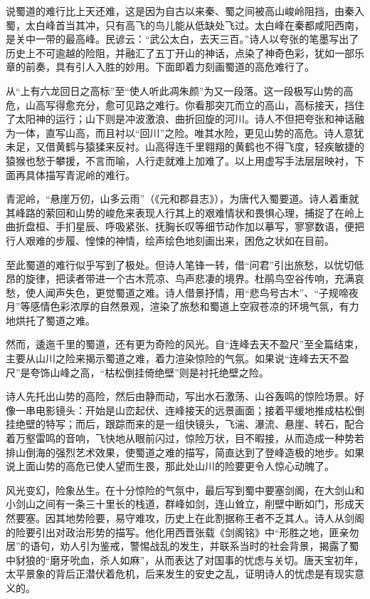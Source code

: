 \documentclass[letterpaper,12pt,english]{sphinxmanual}
\begin{document}
说蜀道的难行比上天还难，这是因为自古以来秦、蜀之间被高山峻岭阻挡，由秦入蜀，太白峰首当其冲，只有高飞的鸟儿能从低缺处飞过。太白峰在秦都咸阳西南，是关中一带的最高峰。民谚云：“武公太白，去天三百。”诗人以夸张的笔墨写出了历史上不可逾越的险阻，并融汇了五丁开山的神话，点染了神奇色彩，犹如一部乐章的前奏，具有引人入胜的妙用。下面即着力刻画蜀道的高危难行了。

从“上有六龙回日之高标”至“使人听此凋朱颜”为又一段落。这一段极写山势的高危，山高写得愈充分，愈可见路之难行。你看那突兀而立的高山，高标接天，挡住了太阳神的运行；山下则是冲波激浪、曲折回旋的河川。诗人不但把夸张和神话融为一体，直写山高，而且衬以“回川”之险。唯其水险，更见山势的高危。诗人意犹未足，又借黄鹤与猿猱来反衬。山高得连千里翱翔的黄鹤也不得飞度，轻疾敏捷的猿猴也愁于攀援，不言而喻，人行走就难上加难了。以上用虚写手法层层映衬，下面再具体描写青泥岭的难行。

青泥岭，“悬崖万仞，山多云雨”（《元和郡县志》），为唐代入蜀要道。诗人着重就其峰路的萦回和山势的峻危来表现人行其上的艰难情状和畏惧心理，捕捉了在岭上曲折盘桓、手扪星辰、呼吸紧张、抚胸长叹等细节动作加以摹写，寥寥数语，便把行人艰难的步履、惶悚的神情，绘声绘色地刻画出来，困危之状如在目前。

至此蜀道的难行似乎写到了极处。但诗人笔锋一转，借“问君”引出旅愁，以忧切低昂的旋律，把读者带进一个古木荒凉、鸟声悲凄的境界。杜鹃鸟空谷传响，充满哀愁，使人闻声失色，更觉蜀道之难。诗人借景抒情，用“悲鸟号古木”、“子规啼夜月”等感情色彩浓厚的自然景观，渲染了旅愁和蜀道上空寂苍凉的环境气氛，有力地烘托了蜀道之难。

然而，逶迤千里的蜀道，还有更为奇险的风光。自“连峰去天不盈尺”至全篇结束，主要从山川之险来揭示蜀道之难，着力渲染惊险的气氛。如果说“连峰去天不盈尺”是夸饰山峰之高，“枯松倒挂倚绝壁”则是衬托绝壁之险。

诗人先托出山势的高险，然后由静而动，写出水石激荡、山谷轰鸣的惊险场景。好像一串电影镜头：开始是山峦起伏、连峰接天的远景画面；接着平缓地推成枯松倒挂绝壁的特写；而后，跟踪而来的是一组快镜头，飞湍、瀑流、悬崖、转石，配合着万壑雷鸣的音响，飞快地从眼前闪过，惊险万状，目不暇接，从而造成一种势若排山倒海的强烈艺术效果，使蜀道之难的描写，简直达到了登峰造极的地步。如果说上面山势的高危已使人望而生畏，那此处山川的险要更令人惊心动魄了。

风光变幻，险象丛生。在十分惊险的气氛中，最后写到蜀中要塞剑阁，在大剑山和小剑山之间有一条三十里长的栈道，群峰如剑，连山耸立，削壁中断如门，形成天然要塞。因其地势险要，易守难攻，历史上在此割据称王者不乏其人。诗人从剑阁的险要引出对政治形势的描写。他化用西晋张载《剑阁铭》中“形胜之地，匪亲勿居”的语句，劝人引为鉴戒，警惕战乱的发生，并联系当时的社会背景，揭露了蜀中豺狼的“磨牙吮血，杀人如麻”，从而表达了对国事的忧虑与关切。唐天宝初年，太平景象的背后正潜伏着危机，后来发生的安史之乱，证明诗人的忧虑是有现实意义的。
\end{document}
